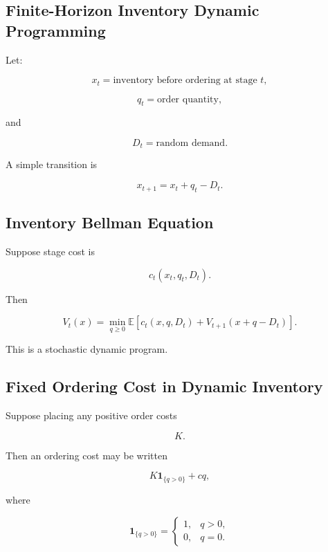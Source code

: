 \subsection{Finite-Horizon Inventory Dynamic Programming}
\label{subsec:finite-horizon-inventory-dp}

Let:

\[
x_t
=
\text{inventory before ordering at stage }t,
\]

\[
q_t
=
\text{order quantity},
\]

and

\[
D_t
=
\text{random demand}.
\]

A simple transition is

\[
\boxed{
x_{t+1}
=
x_t+q_t-D_t.
}
\]

\subsection{Inventory Bellman Equation}
\label{subsec:inventory-bellman-equation}

Suppose stage cost is

\[
c_t(x_t,q_t,D_t).
\]

Then

\[
\boxed{
V_t(x)
=
\min_{q\geq0}
\mathbb{E}
\left[
c_t(x,q,D_t)
+
V_{t+1}
(
x+q-D_t
)
\right].
}
\]

This is a stochastic dynamic program.

\subsection{Fixed Ordering Cost in Dynamic Inventory}
\label{subsec:fixed-ordering-cost-dynamic}

Suppose placing any positive order costs

\[
K.
\]

Then an ordering cost may be written

\[
\boxed{
K\mathbf{1}_{\{q>0\}}
+
cq,
}
\]

where

\[
\mathbf{1}_{\{q>0\}}
=
\begin{cases}
1,
&
q>0,
\\
0,
&
q=0.
\end{cases}
\]

